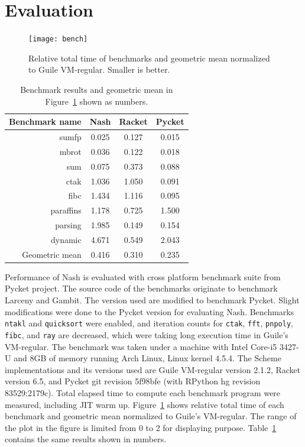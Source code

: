 \documentclass[preprint, numbers]{sigplanconf}
\begin{document}
\section{Evaluation}
\label{sec:evaluation}

\begin{figure}
  \centering
  \texttt{[image: bench]}
  \caption{Relative total time of benchmarks and geometric mean normalized to
    Guile VM-regular. Smaller is better.}
\label{fig:bench}
\end{figure}

\begin{table}
  \centering
  \begin{tabular}{rccc}
    \toprule
    Benchmark name & Nash & Racket & Pycket\\
    \midrule
    sumfp & 0.025 & 0.127 & 0.015 \\
    mbrot & 0.036 & 0.122 & 0.018 \\
    sum & 0.075 & 0.373 & 0.088 \\
    ctak & 1.036 & 1.050 & 0.091 \\
    fibc & 1.434 & 1.116 & 0.095 \\
    paraffins & 1.178 & 0.725 & 1.500 \\
    parsing & 1.985 & 0.149 & 0.154 \\
    dynamic & 4.671 & 0.549 & 2.043 \\
    \midrule
    Geometric mean & 0.416 & 0.310 & 0.235 \\
    \bottomrule
  \end{tabular}
  \caption{Benchmark results and geometric mean in
    Figure~\hyperref[fig:bench]{\ref{fig:bench}} shown as numbers.}
\label{tab:bench}
\end{table}

Performance of Nash is evaluated with cross platform benchmark suite from
Pycket project. The source code of the benchmarks originate to benchmark
Larceny and Gambit. The version used are modified to benchmark Pycket. Slight
modifications were done to the Pycket version for evaluating Nash. Benchmarks
\texttt{ntakl} and \texttt{quicksort} were enabled, and iteration counts for
\texttt{ctak}, \texttt{fft}, \texttt{pnpoly}, \texttt{fibc}, and \texttt{ray}
are decreased, which were taking long execution time in Guile's
VM-regular. The benchmark was taken under a machine with Intel Core-i5 3427-U
and 8GB of memory running Arch Linux, Linux kernel 4.5.4. The Scheme
implementations and its versions used are Guile VM-regular version 2.1.2,
Racket version 6.5, and Pycket git revision 5f98bfe (with RPython hg revision
83529:2179c). Total elapsed time to compute each benchmark program were
measured, including JIT warm up. Figure~\ref{fig:bench} shows relative total
time of each benchmark and geometric mean normalized to Guile's
VM-regular. The range of the plot in the figure is limited from 0 to 2 for
displaying purpose. Table~\hyperref[tab:bench]{\ref{tab:bench}} contains the
same results shown in numbers.
\end{document}
